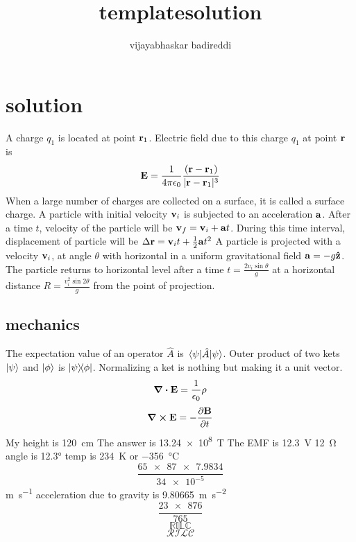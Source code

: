 \documentclass[12pt] {article}
\title{templatesolution}
\author{vijayabhaskar badireddi}
\begin{document}
        
\section*{solution}
A charge $q_1$ is located at point $\vb{r}_1$.
Electric field due to this charge $q_1$ at point $\vb{r}$ is
\[\vb{E}=\frac{1}{4\pi\epsilon_0}\frac{(\vb{r}-\vb{r}_1)}{|\vb{r}-\vb{r}_1|^3}\]
When a large number of charges are collected on a surface, it is called a surface charge.
A particle with initial velocity $\vb{v}_i$ is subjected to an acceleration $\vb{a}$.
After a time $t$, velocity of the particle will be $\vb{v}_f=\vb{v}_i+\vb{a}t$.
During this time interval, displacement of particle will be $\Delta{\vb{r}}=\vb{v}_it+\frac{1}{2}\vb{a}t^2$
A particle is projected with a velocity $\vb{v}_i$, at angle $\theta$ with
 horizontal in a uniform gravitational field $\vb{a}=-g\vu{z}$. The particle returns to 
 horizontal level after a time $t=\frac{2v_i\sin\theta}{g}$ at a horizontal distance
  $R=\frac{v_i^2\sin2\theta}{g}$ from the point of projection.
\subsection*{mechanics}
The expectation value of an operator $\hat{A}$ is $\expval{\hat{A}}{\psi}$. Outer product 
of two kets $\ket{\psi}$ and $\ket{\phi}$ is $\op{\psi}{\phi}$.
Normalizing a ket is nothing but making it a unit vector.
\[\div{\vb{E}}=\frac{1}{\epsilon_0}\rho\]
\[\curl{\vb{E}}=-\pdv{\vb{B}}{t}\]
My height is \SI{120}{\centi\metre}
The answer is \SI{13.24e8}{\tesla}
The EMF is \SI{12.3}{\volt}
\SI{12}{\ohm}\\
angle is \ang{12.3}
temp is \SI{234}{\kelvin} or \SI{-356}{\celsius}
\[\frac{\num{65 x 87 x 7.9834}}{\num{34e-5}}\]
\si{\meter\per\second}
acceleration due to gravity is \SI{9.80665}{\meter\per\square\second}
\[\frac{\num{23 x 876}}{\num{765}}\]
\[\mathbb{RILC}\]
\[\mathcal{RILC}\]
\end{document}
